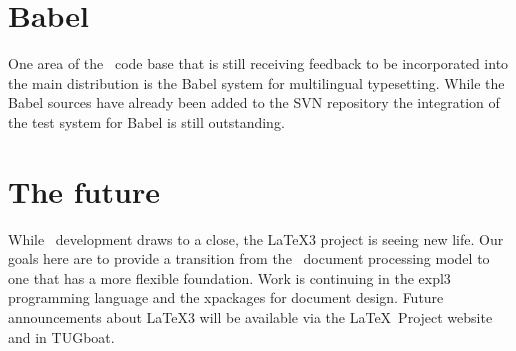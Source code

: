 \documentclass{ltnews}
\begin{document}
\section{Babel}

One area of the \LaTeXe\ code base that is still receiving feedback to
be incorporated into the main distribution is the Babel system for
multilingual typesetting.
While the Babel sources have already been added to the SVN repository the
integration of the test system for Babel is still outstanding.


\section{The future}

While \LaTeXe\ development draws to a close, the \LaTeX3 project is
seeing new life. Our goals here are to provide a transition from the
\LaTeXe\ document processing model to one that has a more flexible
foundation. Work is continuing in the \textsf{expl3} programming
language and the \textsf{xpackages} for document design. Future
announcements
about \LaTeX3 will be available via the \LaTeX\ Project
website and in TUGboat.
\end{document}
